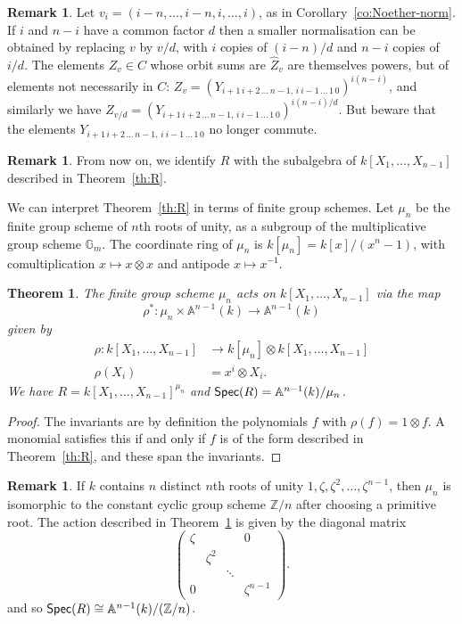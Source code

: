 \documentclass[12pt]{amsart}
\newcommand{\Spec}{\operatorname{\sf Spec}}
\newcommand{\bA}{\mathbb{A}}
\newcommand{\bG}{\mathbb{G}}
\newcommand{\bZ}{{\mathbb{Z}}}
\numberwithin{equation}{section}
\newtheorem{theorem}[equation]{Theorem}
\theoremstyle{definition}
\newtheorem{remark}[equation]{Remark}
\begin{document}
\begin{remark}
Let $v_i=(i-n,\dots,i-n,i,\dots,i)$, as in Corollary~\ref{co:Noether-norm}.
If $i$ and $n-i$ have a common factor $d$ then a smaller normalisation
can be obtained by replacing $v$ by $v/d$, with $i$ copies of
$(i-n)/d$ and $n-i$ copies of $i/d$.
The elements $Z_v\in C$ whose orbit sums are $\hat Z_v$  are
themselves powers, but of
elements not necessarily in $C$:
$Z_v=(Y_{i+1\,i+2\,\dots\,n-1,\,i\ i-1\,\dots\,1\,0})^{i(n-i)}$,
and similarly we have
$Z_{v/d}=(Y_{i+1\,i+2\,\dots\,n-1,\,i\ i-1\,\dots\,1\,0})^{i(n-i)/d}$.
But beware that the elements 
$Y_{i+1\,i+2\,\dots\,n-1,\,i\ i-1\,\dots\,1\,0}$ no longer commute.
\end{remark}

\begin{remark}
From now on, we identify $R$ with the subalgebra of
$k[X_1,\dots,X_{n-1}]$ described in Theorem~\ref{th:R}.
\end{remark}

We can interpret Theorem~\ref{th:R} in terms of finite group schemes. Let $\mu_n$ be
the finite group scheme of $n$th roots of unity, as a subgroup of the
multiplicative group scheme $\bG_m$. The coordinate ring of $\mu_n$ is
$k[\mu_n]=k[x]/(x^n-1)$, with comultiplication $x \mapsto x\otimes x$
and antipode $x \mapsto x^{-1}$.

\begin{theorem}\label{th:mu_n}
The finite group scheme $\mu_n$ acts on $k[X_1,\dots,X_{n-1}]$ via the
map 
\[ \rho^*\colon \mu_n\times \bA^{n-1}(k) \to \bA^{n-1}(k) \] 
given by
\begin{align*}
\rho\colon k[X_1,\dots,X_{n-1}]&\to k[\mu_n]\otimes k[X_1,\dots,X_{n-1}]\\
\rho(X_i)&= x^i\otimes X_i.
\end{align*}
We have $R=k[X_1,\dots,X_{n-1}]^{\mu_n}$ and $\Spec(R)=\bA^{n-1}(k)/\mu_n$.
\end{theorem}
\begin{proof}
The invariants are by definition the polynomials $f$ with
$\rho(f)=1\otimes f$. A monomial satisfies this if and only if $f$ is
of the form described in Theorem~\ref{th:R}, and these span the invariants.
\end{proof}


\begin{remark}\label{rk:zeta}
If $k$ contains $n$ distinct $n$th roots of unity $1,\zeta,
\zeta^2,\dots,\zeta^{n-1}$, then $\mu_n$ is
isomorphic to the constant cyclic group scheme $\bZ/n$ after choosing
a primitive root. The action described in 
Theorem~\ref{th:mu_n} is given by the diagonal matrix
\[ \begin{pmatrix} \zeta & & &  0 \\
&\zeta^2 & & \\
&&\ddots & \\
 0& & & \zeta^{n-1}
\end{pmatrix}. \]
and so $\Spec(R)\cong \bA^{n-1}(k)/(\bZ/n)$.
\end{remark}
\end{document}
